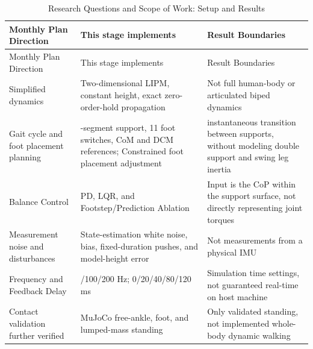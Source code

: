 \FloatBarrier\begingroup\small\setlength{\tabcolsep}{2.5pt}
\begin{longtable}[]{@{}
  >{\raggedright\arraybackslash}p{}
  >{\raggedright\arraybackslash}p{}
  >{\raggedright\arraybackslash}p{}@{}}
\caption{Research Questions and Scope of Work: Setup and Results}\label{tab:s17-1}\tabularnewline
\toprule\noalign{}
\begin{minipage}[b]{\linewidth}\raggedright
Monthly Plan Direction
\end{minipage} & \begin{minipage}[b]{\linewidth}\raggedright
This stage implements
\end{minipage} & \begin{minipage}[b]{\linewidth}\raggedright
Result Boundaries
\end{minipage} \\
\midrule\noalign{}
\endfirsthead
\toprule\noalign{}
\begin{minipage}[b]{\linewidth}\raggedright
Monthly Plan Direction
\end{minipage} & \begin{minipage}[b]{\linewidth}\raggedright
This stage implements
\end{minipage} & \begin{minipage}[b]{\linewidth}\raggedright
Result Boundaries
\end{minipage} \\
\midrule\noalign{}
\endhead
\bottomrule\noalign{}
\endlastfoot
Simplified dynamics & Two-dimensional LIPM, constant height, exact zero-order-hold propagation & Not full human-body or articulated biped dynamics \\
Gait cycle and foot placement planning & 12-segment support, 11 foot switches, CoM and DCM references; Constrained foot placement adjustment & instantaneous transition between supports, without modeling double support and swing leg inertia \\
Balance Control & PD, LQR, and Footstep/Prediction Ablation & Input is the CoP within the support surface, not directly representing joint torques \\
Measurement noise and disturbances & State-estimation white noise, bias, fixed-duration pushes, and model-height error & Not measurements from a physical IMU \\
Frequency and Feedback Delay & 50/100/200 Hz; 0/20/40/80/120 ms & Simulation time settings, not guaranteed real-time on host machine \\
Contact validation further verified & MuJoCo free-ankle, foot, and lumped-mass standing & Only validated standing, not implemented whole-body dynamic walking \\
\end{longtable}\endgroup

